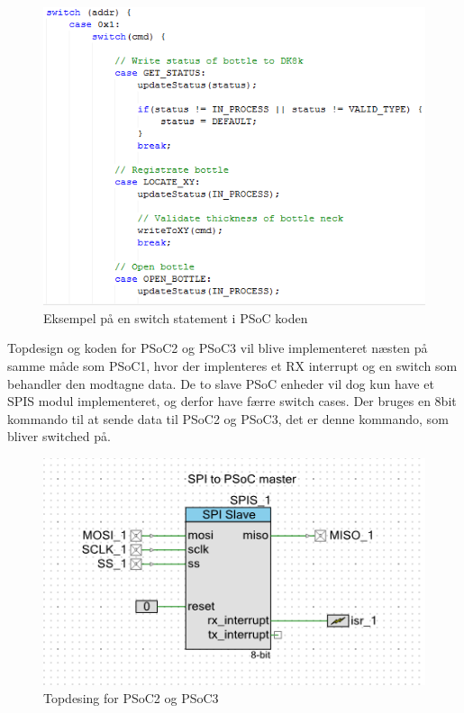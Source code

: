 \begin{figure}[H]
\includegraphics[scale=0.9]{Screenshots/PSOC_switch}
\caption{Eksempel på en switch statement i PSoC koden}
\end{figure}

Topdesign og koden for PSoC2 og PSoC3 vil blive implementeret næsten på samme måde som PSoC1, hvor der implenteres et RX interrupt og en switch som 
behandler den modtagne data. De to slave PSoC enheder vil dog kun have et SPIS modul implementeret, og derfor have færre switch cases.
Der bruges en 8bit kommando til at sende data til PSoC2 og PSoC3, det er denne kommando, som bliver switched på.  
\begin{figure}[H]
\includegraphics{Screenshots/PSOC_topdesign_SPIS}
\caption{Topdesing for PSoC2 og PSoC3}
\end{figure}

